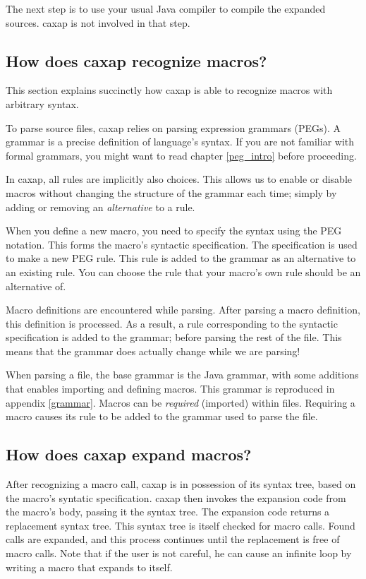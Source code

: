 The next step is to use your usual Java compiler to compile the expanded
sources. caxap is not involved in that step.

\subsection{How does caxap recognize macros?}

This section explains succinctly how caxap is able to recognize macros with
arbitrary syntax.

To parse source files, caxap relies on parsing expression grammars (PEGs). A
grammar is a precise definition of language's syntax. If you are not familiar
with formal grammars, you might want to read chapter \ref{peg_intro} before
proceeding.

In caxap, all rules are implicitly also choices. This allows us to enable or
disable macros without changing the structure of the grammar each time; simply
by adding or removing an \emph{alternative} to a rule.

When you define a new macro, you need to specify the syntax using the PEG
notation. This forms the macro's syntactic specification. The specification is
used to make a new PEG rule. This rule is added to the grammar as an alternative
to an existing rule. You can choose the rule that your macro's own rule should
be an alternative of.

Macro definitions are encountered while parsing. After parsing a macro
definition, this definition is processed. As a result, a rule corresponding to
the syntactic specification is added to the grammar; before parsing the rest of
the file. This means that the grammar does actually change while we are parsing!

When parsing a file, the base grammar is the Java grammar, with some additions
that enables importing and defining macros. This grammar is reproduced in
appendix \ref{grammar}. Macros can be \emph{required} (imported) within
files. Requiring a macro causes its rule to be added to the grammar used to
parse the file.

\subsection{How does caxap expand macros?}
\label{macro_expansion_intro}

After recognizing a macro call, caxap is in possession of its syntax tree, based
on the macro's syntatic specification. caxap then invokes the expansion code
from the macro's body, passing it the syntax tree. The expansion code returns a
replacement syntax tree. This syntax tree is itself checked for macro
calls. Found calls are expanded, and this process continues until the
replacement is free of macro calls. Note that if the user is not careful, he can
cause an infinite loop by writing a macro that expands to itself.

